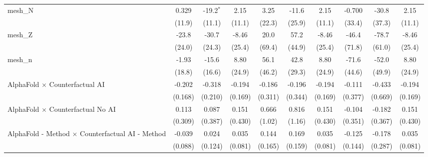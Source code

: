 \begin{tabular}{lccccccccc}
   mesh\_N                                                     & 0.329         & -19.2$^{*}$   & 2.15          & 3.25         & -11.6        & 2.15          & -0.700       & -30.8   & 2.15\\   
                                                               & (11.9)        & (11.1)        & (11.1)        & (22.3)       & (25.9)       & (11.1)        & (33.4)       & (37.3)  & (11.1)\\   
   mesh\_Z                                                     & -23.8         & -30.7         & -8.46         & 20.0         & 57.2         & -8.46         & -46.4        & -78.7   & -8.46\\   
                                                               & (24.0)        & (24.3)        & (25.4)        & (69.4)       & (44.9)       & (25.4)        & (71.8)       & (61.0)  & (25.4)\\   
   mesh\_n                                                     & -1.93         & -15.6         & 8.80          & 56.1         & 42.8         & 8.80          & -71.6        & -52.0   & 8.80\\   
                                                               & (18.8)        & (16.6)        & (24.9)        & (46.2)       & (29.3)       & (24.9)        & (44.6)       & (49.9)  & (24.9)\\   
   AlphaFold $\times$ Counterfactual AI                        & -0.202        & -0.318        & -0.194        & -0.186       & -0.196       & -0.194        & -0.111       & -0.433  & -0.194\\   
                                                               & (0.168)       & (0.210)       & (0.169)       & (0.311)      & (0.344)      & (0.169)       & (0.377)      & (0.669) & (0.169)\\   
   AlphaFold $\times$ Counterfactual No AI                     & 0.113         & 0.087         & 0.151         & 0.666        & 0.816        & 0.151         & -0.104       & -0.182  & 0.151\\   
                                                               & (0.309)       & (0.387)       & (0.430)       & (1.02)       & (1.16)       & (0.430)       & (0.351)      & (0.367) & (0.430)\\   
   AlphaFold - Method $\times$ Counterfactual AI - Method      & -0.039        & 0.024         & 0.035         & 0.144        & 0.169        & 0.035         & -0.125       & -0.178  & 0.035\\   
                                                               & (0.088)       & (0.124)       & (0.081)       & (0.165)      & (0.159)      & (0.081)       & (0.144)      & (0.287) & (0.081)\\   

\end{tabular}
